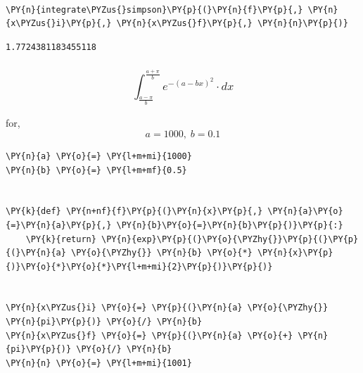     \begin{center}
    \end{center}
    { \hspace*{\fill} \\}
    
    \begin{tcolorbox}[breakable, size=fbox, boxrule=1pt, pad at break*=1mm,colback=cellbackground, colframe=cellborder]
\begin{Verbatim}[commandchars=\\\{\}]
\PY{n}{integrate\PYZus{}simpson}\PY{p}{(}\PY{n}{f}\PY{p}{,} \PY{n}{x\PYZus{}i}\PY{p}{,} \PY{n}{x\PYZus{}f}\PY{p}{,} \PY{n}{n}\PY{p}{)}
\end{Verbatim}
\end{tcolorbox}

            \begin{tcolorbox}[breakable, size=fbox, boxrule=.5pt, pad at break*=1mm, opacityfill=0]
\begin{Verbatim}[commandchars=\\\{\}]
1.7724381183455118
\end{Verbatim}
\end{tcolorbox}
        
    \hypertarget{int_fraca-pibfracapib-e-a-bx2-cdot-dx}{%
\subsubsection{\texorpdfstring{\[\int_{\frac{a-\pi}{b}}^{\frac{a+\pi}{b}} e^{-(a-bx)^2} \cdot dx\]}{\textbackslash int\_\{\textbackslash frac\{a-\textbackslash pi\}\{b\}\}\^{}\{\textbackslash frac\{a+\textbackslash pi\}\{b\}\} e\^{}\{-(a-bx)\^{}2\} \textbackslash cdot dx}}\label{int_fraca-pibfracapib-e-a-bx2-cdot-dx}}

for, \[a = 1000, \; b = 0.1\]

    \begin{tcolorbox}[breakable, size=fbox, boxrule=1pt, pad at break*=1mm,colback=cellbackground, colframe=cellborder]
\begin{Verbatim}[commandchars=\\\{\}]
\PY{n}{a} \PY{o}{=} \PY{l+m+mi}{1000}
\PY{n}{b} \PY{o}{=} \PY{l+m+mf}{0.5}


\PY{k}{def} \PY{n+nf}{f}\PY{p}{(}\PY{n}{x}\PY{p}{,} \PY{n}{a}\PY{o}{=}\PY{n}{a}\PY{p}{,} \PY{n}{b}\PY{o}{=}\PY{n}{b}\PY{p}{)}\PY{p}{:}
    \PY{k}{return} \PY{n}{exp}\PY{p}{(}\PY{o}{\PYZhy{}}\PY{p}{(}\PY{p}{(}\PY{n}{a} \PY{o}{\PYZhy{}} \PY{n}{b} \PY{o}{*} \PY{n}{x}\PY{p}{)}\PY{o}{*}\PY{o}{*}\PY{l+m+mi}{2}\PY{p}{)}\PY{p}{)}


\PY{n}{x\PYZus{}i} \PY{o}{=} \PY{p}{(}\PY{n}{a} \PY{o}{\PYZhy{}} \PY{n}{pi}\PY{p}{)} \PY{o}{/} \PY{n}{b}
\PY{n}{x\PYZus{}f} \PY{o}{=} \PY{p}{(}\PY{n}{a} \PY{o}{+} \PY{n}{pi}\PY{p}{)} \PY{o}{/} \PY{n}{b}
\PY{n}{n} \PY{o}{=} \PY{l+m+mi}{1001}
\end{Verbatim}
\end{tcolorbox}


